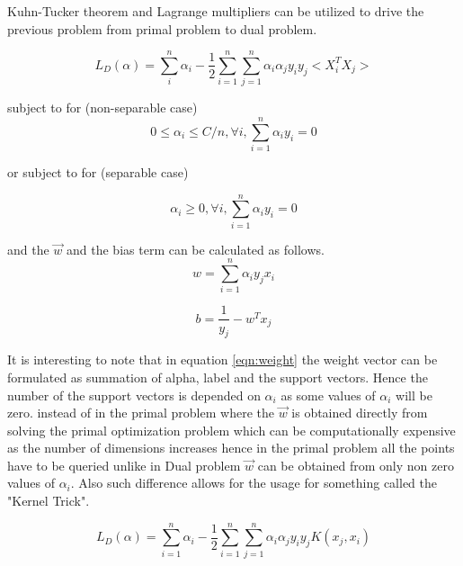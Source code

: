 \documentclass[10pt,onecolumn,letterpaper]{article}
\begin{document}
Kuhn-Tucker theorem and Lagrange multipliers can be utilized to drive the previous problem from primal problem to dual problem. 

\begin{equation}
L_{D}\left( \alpha \right) =\sum ^{n}_{i}\alpha _{i}-\dfrac{1}{2}\sum ^{n}_{i=1}\sum ^{n}_{j=1}\alpha _{i}\alpha _{j}y_{i}y_{j} <X_{i}^{T}X_{j} >
\label{eqn:l}
\end{equation}

subject to for (non-separable case)
\begin{equation}
0 \leq \alpha_{i} \leq C/n , \forall i,\sum ^{n}_{i=1}\alpha _{i}y_{i}=0
\end{equation}

or subject to for (separable case)

\begin{equation}
\alpha_{i} \geq 0 , \forall i,\sum ^{n}_{i=1}\alpha _{i}y_{i}=0
\end{equation}

and the $\overrightarrow{w}$ and the bias term can be calculated as follows. 
\begin{equation}
w=\sum ^{n}_{i=1}\alpha _{i}y_{j}x_{i}
\label{eqn:weight}
\end{equation}

\begin{equation}
b =\dfrac{1}{y_{j}}-w^{T}x_{j}
\end{equation}
 
It is interesting to note that in equation \ref{eqn:weight} the weight vector can be formulated as summation of alpha, label and the support vectors. Hence the number of the support vectors is depended on $\alpha _{i}$ as some values of $\alpha _{i}$ will be zero.
instead of in the primal problem where the $\overrightarrow{w}$ is obtained directly from solving the primal optimization problem which can be computationally expensive as the number of dimensions increases hence in the primal problem all the points have to be queried unlike in Dual problem $\overrightarrow{w}$ can be obtained from only non zero values of $\alpha _{i}$. Also such difference allows for the usage for something called the "Kernel Trick".
 
\begin{equation}
L_{D}\left( \alpha \right) =\sum ^{n}_{i=1}\alpha _{i}-\dfrac{1}{2}\sum ^{n}_{i=1}\sum ^{n}_{j=1}\alpha _{i}\alpha _{j}y_{i}y_{j}K\left( x_{j},x_{i}\right) 
\label{eqn:lk}
\end{equation} 
\end{document}
